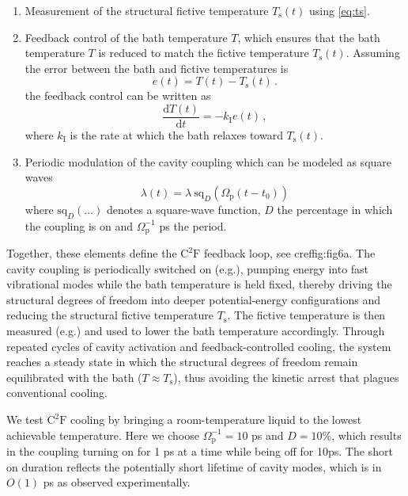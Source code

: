 \documentclass[aps, prl,
 reprint,
 superscriptaddress,
 citeautoscript,  %
 amsmath,amssymb,
 tightenlines
]{revtex4-2}
\begin{document}
\begin{enumerate}
    \item Measurement of the structural fictive temperature $T_\mathrm{s}(t)$ using \cref{eq:ts}.
    \item Feedback control of the bath temperature $T$, which ensures that the bath temperature $T$ is reduced to match the fictive temperature $T_\mathrm{s}(t)$. Assuming the error between the bath and fictive temperatures is
    \begin{equation}
    e(t) = T(t)-T_\mathrm{s}(t) \,.
    \end{equation}
    the feedback control can be written as
    \begin{equation}
    \frac{\mathrm{d}T(t)}{\mathrm{d} t} = -k_\mathrm{I}e(t) \,, \label{eq:feedback}
    \end{equation}
    where $k_\mathrm{I}$ is the rate at which the bath relaxes toward $T_\mathrm{s}(t)$.
    \item Periodic modulation of the cavity coupling which can be modeled as square waves
    \begin{equation}
    \lambda(t) = \lambda \ \mathrm{sq}_D(\Omega_\mathrm{p}(t-t_\mathrm{0})) \label{eq:squarewave_coupling}
    \end{equation}
    where $\mathrm{sq}_D(\ldots)$ denotes a square-wave function, $D$ the percentage in which the coupling is on and  $\Omega_\mathrm{p}^{-1}$ ps the period. 
\end{enumerate}

Together, these elements define the $\mathrm{C^2F}$ feedback loop, see cref{fig:fig6}a. The cavity coupling is periodically switched on (e.g.), pumping energy into fast vibrational modes while the bath temperature is held fixed, thereby driving the structural degrees of freedom into deeper potential-energy configurations and reducing the structural fictive temperature $T_\mathrm{s}$. The fictive temperature is then measured (e.g.) and used to lower the bath temperature accordingly. Through repeated cycles of cavity activation and feedback-controlled cooling, the system reaches a steady state in which the structural degrees of freedom remain equilibrated with the bath ($T \approx T_\mathrm{s}$), thus avoiding the kinetic arrest that plagues conventional cooling.


We test $\mathrm{C^2 F}$ cooling by bringing a room-temperature liquid to the lowest achievable temperature. Here we choose  $\Omega_\mathrm{p}^{-1}=10$ ps  and $D=10 \% $, which results in the coupling turning on for 1 ps at a time while being off for 10ps. The short on duration reflects the potentially short lifetime of cavity modes, which is in $O(1)$ ps as observed experimentally.\cite{D4CS01024H,10.1063/5.0282687}
\end{document}
